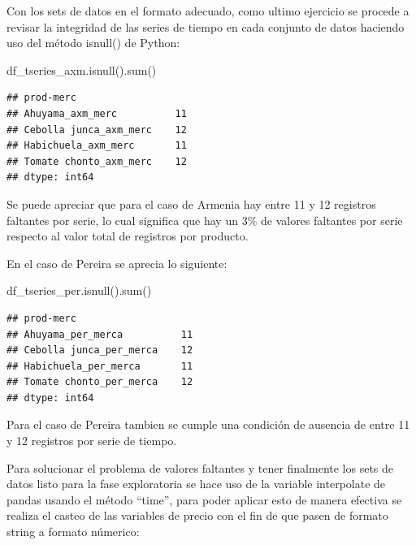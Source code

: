 \documentclass[
]{book}
\newenvironment{Shaded}{\begin{snugshade}}{\end{snugshade}}
\newcommand{\BuiltInTok}[1]{#1}
\newcommand{\NormalTok}[1]{#1}
\begin{document}
Con los sets de datos en el formato adecuado, como ultimo ejercicio se procede a revisar la integridad de las series de tiempo en cada conjunto de datos haciendo uso del método isnull() de Python:

\begin{Shaded}
\begin{Highlighting}[]


\NormalTok{df\_tseries\_axm.isnull().}\BuiltInTok{sum}\NormalTok{()}
\end{Highlighting}
\end{Shaded}

\begin{verbatim}
## prod-merc
## Ahuyama_axm_merc          11
## Cebolla junca_axm_merc    12
## Habichuela_axm_merc       11
## Tomate chonto_axm_merc    12
## dtype: int64
\end{verbatim}

Se puede apreciar que para el caso de Armenia hay entre 11 y 12 registros faltantes por serie, lo cual significa que hay un 3\% de valores faltantes por serie respecto al valor total de registros por producto.

En el caso de Pereira se aprecia lo siguiente:

\begin{Shaded}
\begin{Highlighting}[]

\NormalTok{df\_tseries\_per.isnull().}\BuiltInTok{sum}\NormalTok{()}
\end{Highlighting}
\end{Shaded}

\begin{verbatim}
## prod-merc
## Ahuyama_per_merca          11
## Cebolla junca_per_merca    12
## Habichuela_per_merca       11
## Tomate chonto_per_merca    12
## dtype: int64
\end{verbatim}

Para el caso de Pereira tambien se cumple una condición de ausencia de entre 11 y 12 registros por serie de tiempo.

Para solucionar el problema de valores faltantes y tener finalmente los sets de datos listo para la fase exploratoria se hace uso de la variable interpolate de pandas usando el método ``time'', para poder aplicar esto de manera efectiva se realiza el casteo de las variables de precio con el fin de que pasen de formato string a formato númerico:
\end{document}
